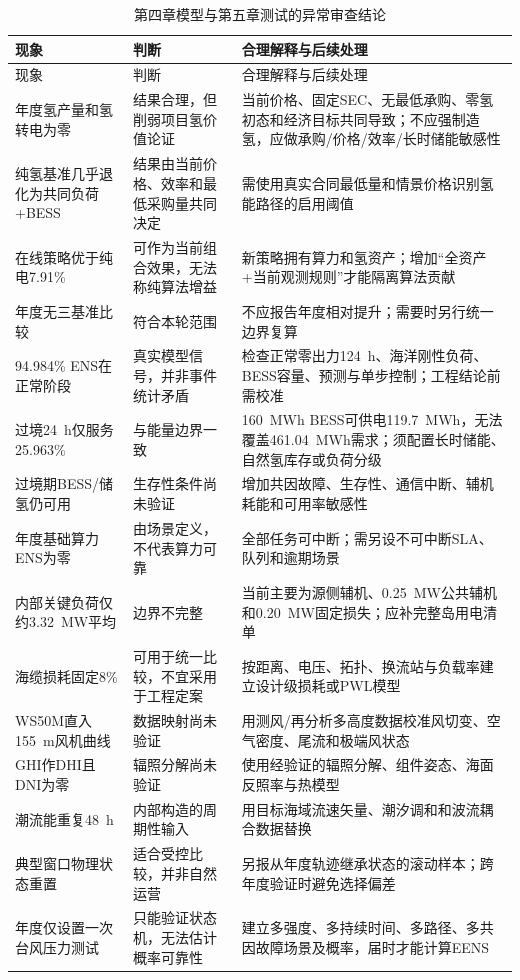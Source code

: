 \begin{longtable}{p{2.8cm}p{4.4cm}p{6.1cm}}
\caption{第四章模型与第五章测试的异常审查结论}\label{tab:c5-anomaly-audit}\\
\toprule
现象 & 判断 & 合理解释与后续处理\\
\midrule
\endfirsthead
\toprule
现象 & 判断 & 合理解释与后续处理\\
\midrule
\endhead
年度氢产量和氢转电为零 & 结果合理，但削弱项目氢价值论证 & 当前价格、固定SEC、无最低承购、零氢初态和经济目标共同导致；不应强制造氢，应做承购/价格/效率/长时储能敏感性\\
纯氢基准几乎退化为共同负荷+BESS & 结果由当前价格、效率和最低采购量共同决定 & 需使用真实合同最低量和情景价格识别氢能路径的启用阈值\\
在线策略优于纯电7.91\% & 可作为当前组合效果，无法称纯算法增益 & 新策略拥有算力和氢资产；增加“全资产+当前观测规则”才能隔离算法贡献\\
年度无三基准比较 & 符合本轮范围 & 不应报告年度相对提升；需要时另行统一边界复算\\
94.984\% ENS在正常阶段 & 真实模型信号，并非事件统计矛盾 & 检查正常零出力124~h、海洋刚性负荷、BESS容量、预测与单步控制；工程结论前需校准\\
过境24~h仅服务25.963\% & 与能量边界一致 & 160~MWh BESS可供电119.7~MWh，无法覆盖461.04~MWh需求；须配置长时储能、自然氢库存或负荷分级\\
过境期BESS/储氢仍可用 & 生存性条件尚未验证 & 增加共因故障、生存性、通信中断、辅机耗能和可用率敏感性\\
年度基础算力ENS为零 & 由场景定义，不代表算力可靠 & 全部任务可中断；需另设不可中断SLA、队列和逾期场景\\
内部关键负荷仅约3.32~MW平均 & 边界不完整 & 当前主要为源侧辅机、0.25~MW公共辅机和0.20~MW固定损失；应补完整岛用电清单\\
海缆损耗固定8\% & 可用于统一比较，不宜采用于工程定案 & 按距离、电压、拓扑、换流站与负载率建立设计级损耗或PWL模型\\
WS50M直入155~m风机曲线 & 数据映射尚未验证 & 用测风/再分析多高度数据校准风切变、空气密度、尾流和极端风状态\\
GHI作DHI且DNI为零 & 辐照分解尚未验证 & 使用经验证的辐照分解、组件姿态、海面反照率与热模型\\
潮流能重复48~h & 内部构造的周期性输入 & 用目标海域流速矢量、潮汐调和和波流耦合数据替换\\
典型窗口物理状态重置 & 适合受控比较，并非自然运营 & 另报从年度轨迹继承状态的滚动样本；跨年度验证时避免选择偏差\\
年度仅设置一次台风压力测试 & 只能验证状态机，无法估计概率可靠性 & 建立多强度、多持续时间、多路径、多共因故障场景及概率，届时才能计算EENS\\

\end{longtable}
